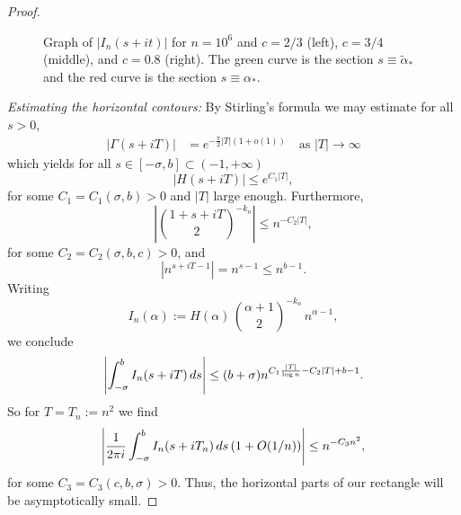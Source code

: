 \documentclass[10pt,a4paper]{amsart}
\newtheorem{scope}{Scope}
\newcommand{\dint}{\textup{d}}
\begin{document}
\begin{proof}
\begin{figure}[ht]
    \caption{Graph of $|I_n(s+it)|$ for $n=10^6$ and $c=2/3$ (left), $c=3/4$ (middle), and $c=0.8$ (right). The green curve is the section $s\equiv \tilde{\alpha}_*$ and the red curve is the section $s\equiv \alpha_*$.}
    \label{fig:graph_In}
\end{figure}

\medskip 
\emph{Estimating the horizontal contours:} 
By Stirling's formula we may estimate for all $s>0$,
\begin{align*}
    |\Gamma(s+iT)| &= e^{-\frac{\pi}{2} |T| (1+o(1))} \quad \text{as $|T| \to \infty$}
\end{align*}
which yields for all $s\in [-\sigma,b]\subset (-1,+\infty)$
\begin{equation*}
    |H(s+iT)| \leq e^{C_1|T|},
\end{equation*}
for some $C_1=C_1(\sigma,b)>0$ and $|T|$ large enough.
Furthermore,
\begin{equation*}
    \left|\binom{1+s+iT}{2}^{-k_n}\right| 
    \leq n^{-C_2|T|},
\end{equation*}
for some $C_2=C_2(\sigma,b,c)>0$, and
\begin{equation*}
    |n^{s+iT-1}| = n^{s-1}\leq n^{b-1}.
\end{equation*}
Writing
\begin{equation*}
    I_n(\alpha) := H(\alpha)\, \binom{\alpha+1}{2}^{-k_n}\, n^{\alpha-1}, 
\end{equation*}
we conclude
\begin{equation*}
    \left|\int_{-\sigma}^b I_n(s+iT)\, \dint s \right| \leq (b+\sigma) n^{C_1\frac{|T|}{\log n}-C_2|T|+b-1}.
\end{equation*}
So for $T=T_n:=n^2$ we find
\begin{equation*}
    \left|\frac{1}{2\pi i} \int_{-\sigma}^b I_n(s+iT_n)\, \dint s\, (1+O(1/n)) \right| \leq n^{-C_3 n^2},
\end{equation*}
for some $C_3=C_3(c,b,\sigma)>0$.
Thus, the horizontal parts of our rectangle will be asymptotically small.
\medskip


\end{proof}
\end{document}
